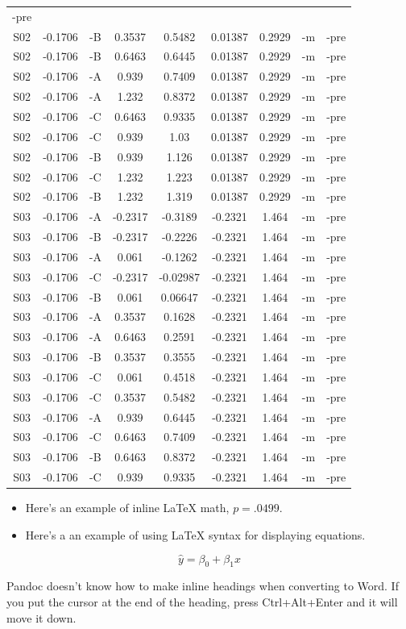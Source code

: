 \documentclass[\pandocDocMode,longtable,noextraspace,floatsintext]{apa6}
\begin{document}
\begin{longtable}[]{@{}ccccccccc@{}}
-pre\tabularnewline
S02 & -0.1706 & -B & 0.3537 & 0.5482 & 0.01387 & 0.2929 & -m &
-pre\tabularnewline
S02 & -0.1706 & -B & 0.6463 & 0.6445 & 0.01387 & 0.2929 & -m &
-pre\tabularnewline
S02 & -0.1706 & -A & 0.939 & 0.7409 & 0.01387 & 0.2929 & -m &
-pre\tabularnewline
S02 & -0.1706 & -A & 1.232 & 0.8372 & 0.01387 & 0.2929 & -m &
-pre\tabularnewline
S02 & -0.1706 & -C & 0.6463 & 0.9335 & 0.01387 & 0.2929 & -m &
-pre\tabularnewline
S02 & -0.1706 & -C & 0.939 & 1.03 & 0.01387 & 0.2929 & -m &
-pre\tabularnewline
S02 & -0.1706 & -B & 0.939 & 1.126 & 0.01387 & 0.2929 & -m &
-pre\tabularnewline
S02 & -0.1706 & -C & 1.232 & 1.223 & 0.01387 & 0.2929 & -m &
-pre\tabularnewline
S02 & -0.1706 & -B & 1.232 & 1.319 & 0.01387 & 0.2929 & -m &
-pre\tabularnewline
S03 & -0.1706 & -A & -0.2317 & -0.3189 & -0.2321 & 1.464 & -m &
-pre\tabularnewline
S03 & -0.1706 & -B & -0.2317 & -0.2226 & -0.2321 & 1.464 & -m &
-pre\tabularnewline
S03 & -0.1706 & -A & 0.061 & -0.1262 & -0.2321 & 1.464 & -m &
-pre\tabularnewline
S03 & -0.1706 & -C & -0.2317 & -0.02987 & -0.2321 & 1.464 & -m &
-pre\tabularnewline
S03 & -0.1706 & -B & 0.061 & 0.06647 & -0.2321 & 1.464 & -m &
-pre\tabularnewline
S03 & -0.1706 & -A & 0.3537 & 0.1628 & -0.2321 & 1.464 & -m &
-pre\tabularnewline
S03 & -0.1706 & -A & 0.6463 & 0.2591 & -0.2321 & 1.464 & -m &
-pre\tabularnewline
S03 & -0.1706 & -B & 0.3537 & 0.3555 & -0.2321 & 1.464 & -m &
-pre\tabularnewline
S03 & -0.1706 & -C & 0.061 & 0.4518 & -0.2321 & 1.464 & -m &
-pre\tabularnewline
S03 & -0.1706 & -C & 0.3537 & 0.5482 & -0.2321 & 1.464 & -m &
-pre\tabularnewline
S03 & -0.1706 & -A & 0.939 & 0.6445 & -0.2321 & 1.464 & -m &
-pre\tabularnewline
S03 & -0.1706 & -C & 0.6463 & 0.7409 & -0.2321 & 1.464 & -m &
-pre\tabularnewline
S03 & -0.1706 & -B & 0.6463 & 0.8372 & -0.2321 & 1.464 & -m &
-pre\tabularnewline
S03 & -0.1706 & -C & 0.939 & 0.9335 & -0.2321 & 1.464 & -m &
-pre\tabularnewline
\bottomrule
\end{longtable}

\begin{itemize}
\item
  Here's an example of inline LaTeX math, \(p=.0499\).
\item
  Here's a an example of using LaTeX syntax for displaying equations.
\end{itemize}

\[
\hat{y} = \beta_0 + \beta_1 x
\]

Pandoc doesn't know how to make inline headings when converting to Word.
If you put the cursor at the end of the heading, press Ctrl+Alt+Enter
and it will move it down.
\end{document}
